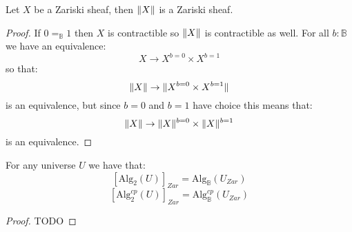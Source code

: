 \begin{lemma}\label{truncation-zariski}
Let $X$ be a Zariski sheaf, then $\lVert X \rVert$ is a Zariski sheaf.
\end{lemma}

\begin{proof}
If $0=_\mathbb{B}1$ then $X$ is contractible so $\lVert X \rVert$ is contractible as well. For all $b:\mathbb{B}$ we have an equivalence:
\[X\to X^{b=0}\times X^{b=1}\]
so that:
\[\lVert X \rVert\to \lVert X^{b=0}\times X^{b=1} \rVert\]
is an equivalence, but since $b=0$ and $b=1$ have choice this means that:
\[\lVert X \rVert\to \lVert X \rVert^{b=0}\times \lVert X \rVert^{b=1}\]
is an equivalence.
\end{proof}

\begin{lemma}\label{zariski-cp-iff-cp}
For any universe $U$ we have that:
\[[\mathrm{Alg}_2(U)]_{Zar} = \mathrm{Alg}_\mathbb{B}(U_{Zar})\]
\[[\mathrm{Alg}_2^{cp}(U)]_{Zar} = \mathrm{Alg}_\mathbb{B}^{cp}(U_{Zar})\]
\end{lemma}

\begin{proof}
TODO
\end{proof}



